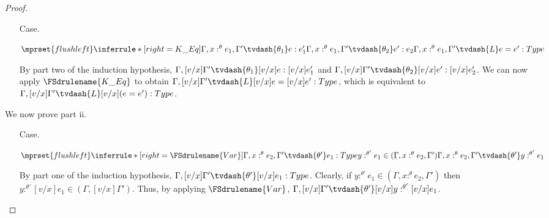 \begin{proof}
\begin{itemize}
    \item[Case.]\ \\
      \begin{center}
        \begin{math}
          $$\mprset{flushleft}
          \inferrule* [right=K\_Eq] {
            \Gamma,x:^\theta e_1,\Gamma' \tvdash{\theta_1} e:e'_1
            \\\\
            \Gamma,x:^\theta e_1,\Gamma' \tvdash{\theta_2} e':e_2
          }{\Gamma,x:^\theta e_1,\Gamma' \tvdash{L} e = e':Type}
        \end{math}
      \end{center}
      By part two of the induction hypothesis, 
      $\Gamma,[v/x]\Gamma' \tvdash{\theta_1} [v/x]e:[v/x]e'_1$ and
      $\Gamma,[v/x]\Gamma' \tvdash{\theta_2} [v/x]e':[v/x]e'_2$.  We can now apply 
      $\FSdrulename{K\_Eq}$ to obtain $\Gamma,[v/x]\Gamma' \tvdash{L} [v/x]e = [v/x]e':Type$,
      which is equivalent to $\Gamma,[v/x]\Gamma' \tvdash{L} [v/x](e = e'):Type$.
  \end{itemize}

  We now prove part ii.
  \begin{itemize}
  \item[Case.]\ \\
     \begin{center}
       \begin{math}
         $$\mprset{flushleft}
         \inferrule* [right=\FSdrulename{Var}]{
           \Gamma,x:^\theta e_2,\Gamma' \tvdash{\theta'} e_1:Type
           \\\\
           y:^{\theta'} e_1 \in (\Gamma,x:^\theta e_2,\Gamma')
         }{\Gamma,x:^\theta e_2,\Gamma' \tvdash{\theta'} y:^{\theta'} e_1}
       \end{math}
     \end{center}
     By part one of the induction hypothesis, 
     $\Gamma,[v/x]\Gamma' \tvdash{\theta'} [v/x]e_1:Type$.  Clearly, if 
     $y:^{\theta'} e_1 \in (\Gamma,x:^\theta e_2,\Gamma')$ then
     $y:^{\theta'} [v/x]e_1 \in (\Gamma,[v/x]\Gamma')$.  Thus,
     by applying $\FSdrulename{Var}$, 
     $\Gamma,[v/x]\Gamma' \tvdash{\theta'} [v/x]y:^{\theta'} [v/x]e_1$.     


\end{itemize}
\end{proof}
